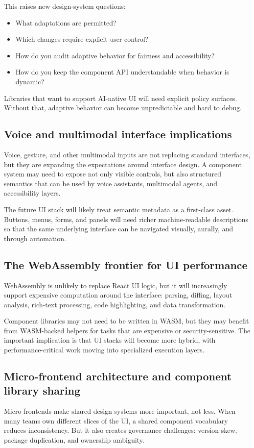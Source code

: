This raises new design-system questions:

\begin{itemize}[leftmargin=*, itemsep=0.35em]
  \item What adaptations are permitted?
  \item Which changes require explicit user control?
  \item How do you audit adaptive behavior for fairness and accessibility?
  \item How do you keep the component API understandable when behavior is dynamic?
\end{itemize}

Libraries that want to support AI-native UI will need explicit policy surfaces. Without that, adaptive behavior can become unpredictable and hard to debug.

\subsection{Voice and multimodal interface implications}
Voice, gesture, and other multimodal inputs are not replacing standard interfaces, but they are expanding the expectations around interface design. A component system may need to expose not only visible controls, but also structured semantics that can be used by voice assistants, multimodal agents, and accessibility layers.

The future UI stack will likely treat semantic metadata as a first-class asset. Buttons, menus, forms, and panels will need richer machine-readable descriptions so that the same underlying interface can be navigated visually, aurally, and through automation.

\subsection{The WebAssembly frontier for UI performance}
WebAssembly is unlikely to replace React UI logic, but it will increasingly support expensive computation around the interface: parsing, diffing, layout analysis, rich-text processing, code highlighting, and data transformation.

Component libraries may not need to be written in WASM, but they may benefit from WASM-backed helpers for tasks that are expensive or security-sensitive. The important implication is that UI stacks will become more hybrid, with performance-critical work moving into specialized execution layers.

\subsection{Micro-frontend architecture and component library sharing}
Micro-frontends make shared design systems more important, not less. When many teams own different slices of the UI, a shared component vocabulary reduces inconsistency. But it also creates governance challenges: version skew, package duplication, and ownership ambiguity.

